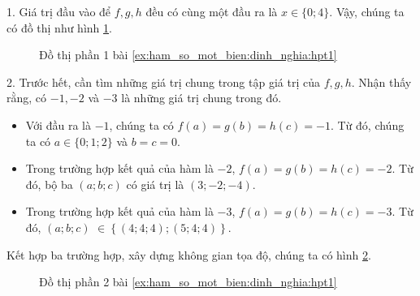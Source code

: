 
1. Giá trị đầu vào để $f, g, h$ đều có cùng một đầu ra là $x\in\{0;4\}$. Vậy, chúng ta có đồ thị như hình \ref{fig:hpt11}.

\begin{figure}[H]
   \centering
   \caption{Đồ thị phần 1 bài \ref{ex:ham_so_mot_bien:dinh_nghia:hpt1}}
   \label{fig:hpt11}
\end{figure}

2. Trước hết, cần tìm những giá trị chung trong tập giá trị của $f, g, h$. Nhận thấy rằng, có $-1, -2$ và $-3$ là những giá trị chung trong đó. 
\begin{itemize}
   \item Với đầu ra là $-1$, chúng ta có $f(a) = g(b) = h(c) = -1$. Từ đó, chúng ta có $a \in \{0; 1; 2\}$ và $b = c = 0$.
   \item Trong trường hợp kết quả của hàm là $-2$, $f(a) = g(b) = h(c) = -2$. Từ đó, bộ ba $\left(a; b; c\right)$ có giá trị là $(3; -2; -4)$.
   \item Trong trường hợp kết quả của hàm là $-3$, $f(a) = g(b) = h(c) = -3$. Từ đó, $\left(a; b; c\right)$ $\in \left\{\left(4; 4; 4\right); \left(5; 4; 4\right)\right\}$.
\end{itemize}
Kết hợp ba trường hợp, xây dựng không gian tọa độ, chúng ta có hình \ref{fig:hpt12}.

\begin{figure}[H]
   \centering
   \caption{Đồ thị phần 2 bài \ref{ex:ham_so_mot_bien:dinh_nghia:hpt1}}
   \label{fig:hpt12}
\end{figure}

